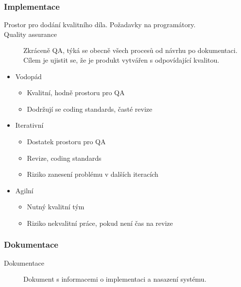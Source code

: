          \subsubsection{Implementace}
            \begin{description}
              \item[Prostor pro dodání kvalitního díla. Požadavky na programátory.]
              \item[Quality assurance] Zkráceně QA, týká se obecně všech procesů od návrhu po dokumentaci.
              Cílem je ujistit se, že je produkt vytvářen s odpovídající kvalitou.
            \end{description}

            \begin{itemize}
              \item Vodopád
                \begin{itemize}
                  \item Kvalitní, hodně prostoru pro QA
                  \item Dodržují se coding standards, časté revize
                \end{itemize}
              \item Iterativní
                \begin{itemize}
                  \item Dostatek prostoru pro QA
                  \item Revize, coding standards
                  \item Riziko zanesení problému v dalších iteracích
                \end{itemize}
              \item Agilní
                \begin{itemize}
                  \item Nutný kvalitní tým
                  \item Riziko nekvalitní práce, pokud není čas na revize
                \end{itemize}
            \end{itemize}

            \subsubsection{Dokumentace}
              \begin{description}
                \item[Dokumentace] Dokument s informacemi o implementaci a nasazení systému.
              \end{description}

